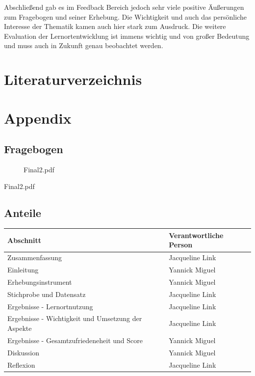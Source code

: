 \documentclass[11pt, a4paper]{article}
\begin{document}
Abschließend gab es im Feedback Bereich jedoch sehr viele positive Äußerungen zum Fragebogen und seiner Erhebung. Die Wichtigkeit und auch das persönliche Interesse der Thematik kamen auch hier stark zum Ausdruck. Die weitere Evaluation der Lernortentwicklung ist immens wichtig und von großer Bedeutung und muss auch in Zukunft genau beobachtet werden.




\newpage
\newpage
\section{Literaturverzeichnis}
\printbibliography
\newpage
\section{Appendix}
\subsection{Fragebogen}
\begin{figure}[h]
 {Final2.pdf}
\end{figure}
\newpage
 {Final2.pdf}
\newpage
\subsection{Anteile}
\begin{table}[h]
	\begin{tabular}{l|l}
		Abschnitt                                          & Verantwortliche Person \\ \hline
		Zusammenfassung                                    & Jacqueline Link        \\
		Einleitung                                         & Yannick Miguel         \\
		Erhebungsinstrument                                & Yannick Miguel         \\
		Stichprobe und Datensatz                           &
		Jacqueline Link        \\
		Ergebnisse - Lernortnutzung                        & Jacqueline Link        \\
		Ergebnisse - Wichtigkeit und Umsetzung der Aspekte & Jacqueline Link        \\
		Ergebnisse - Gesamtzufriedeneheit und Score        & Yannick Miguel         \\
		Diskussion                                         & Yannick Miguel         \\
		Reflexion                                          & Jacqueline Link       
	\end{tabular}
\end{table}
\end{document}
